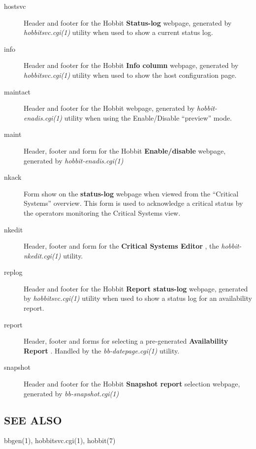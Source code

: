 \begin{description}
 

\item[hostsvc] Header and footer for the Hobbit \textbf{Status-log}
 webpage, generated by \emph{hobbitsvc.cgi(1)}
 utility when used to show a current status log. 

 

\item[info] Header and footer for the Hobbit \textbf{Info column}
 webpage, generated by \emph{hobbitsvc.cgi(1)}
 utility when used to show the host configuration page. 

 

\item[maintact] Header and footer for the Hobbit \textbf{}
 webpage, generated by \emph{hobbit-enadis.cgi(1)}
 utility when using the Enable/Disable ``preview'' mode. 

 

\item[maint] Header, footer and form for the Hobbit \textbf{Enable/disable}
 webpage, generated by \emph{hobbit-enadis.cgi(1)}


 

\item[nkack] Form show on the \textbf{status-log}
 webpage when viewed from the ``Critical Systems'' overview. This form is used to acknowledge a critical status by the operators monitoring the Critical Systems view. 

 

\item[nkedit] Header, footer and form for the \textbf{Critical Systems Editor}
, the \emph{hobbit-nkedit.cgi(1)}
 utility. 

 

\item[replog] Header and footer for the Hobbit \textbf{Report status-log}
 webpage, generated by \emph{hobbitsvc.cgi(1)}
 utility when used to show a status log for an availability report. 

 

\item[report] Header, footer and forms for selecting a pre-generated \textbf{Availability Report}
. Handled by the \emph{bb-datepage.cgi(1)}
 utility. 

 

\item[snapshot] Header and footer for the Hobbit \textbf{Snapshot report}
 selection webpage, generated by \emph{bb-snapshot.cgi(1)}


 


\end{description}

\subsection{SEE ALSO}
bbgen(1), hobbitsvc.cgi(1), hobbit(7) 
